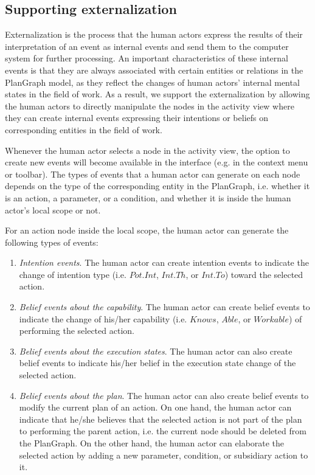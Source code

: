 \subsection{Supporting externalization} %
\label{sub:supporting_externalization}
Externalization is the process that the human actors express the results of their interpretation of an event as internal events and send them to the computer system for further processing. An important characteristics of these internal events is that they are always associated with certain entities or relations in the PlanGraph model, as they reflect the changes of human actors' internal mental states in the field of work. As a result, we support the externalization by allowing the human actors to directly manipulate the nodes in the activity view where they can create internal events expressing their intentions or beliefs on corresponding entities in the field of work.

Whenever the human actor selects a node in the activity view, the option to create new events will become available in the interface (e.g. in the context menu or toolbar). The types of events that a human actor can generate on each node depends on the type of the corresponding entity in the PlanGraph, i.e. whether it is an action, a parameter, or a condition, and whether it is inside the human actor's local scope or not. 

For an action node inside the local scope, the human actor can generate the following types of events:

\begin{enumerate}
	\item \emph{Intention events}. The human actor can create intention events to indicate the change of intention type (i.e. $Pot.Int$, $Int.Th$, or $Int.To$) toward the selected action.
	\item \emph{Belief events about the capability}. The human actor can create belief events to indicate the change of his/her capability (i.e. $Knows$, $Able$, or $Workable$) of performing the selected action.
	\item \emph{Belief events about the execution states}. The human actor can also create belief events to indicate his/her belief in the execution state change of the selected action.
	\item \emph{Belief events about the plan}. The human actor can also create belief events to modify the current plan of an action. On one hand, the human actor can indicate that he/she believes that the selected action is not part of the plan to performing the parent action, i.e. the current node should be deleted from the PlanGraph. On the other hand, the human actor can elaborate the selected action by adding a new parameter, condition, or subsidiary action to it.
\end{enumerate}

